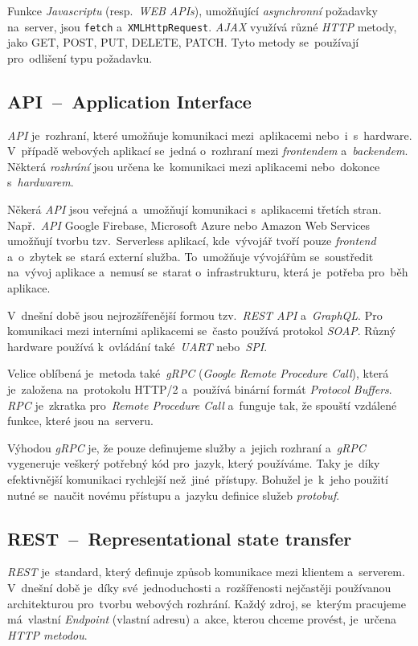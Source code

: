 \documentclass[10pt,a4paper]{article}
\begin{document}
            Funkce \emph{Javascriptu} (resp.~\emph{WEB APIs}), umožňující \emph{asynchronní} požadavky na~server, jsou \texttt{fetch} a~\texttt{XMLHttpRequest}. \emph{AJAX} využívá různé \emph{HTTP} metody, jako GET, POST, PUT, DELETE, PATCH. Tyto metody se~používají pro~odlišení typu požadavku.\cite{ajax:mdn}

        \subsection{API~--~Application Interface}
            \emph{API} je~rozhraní, které umožňuje komunikaci mezi~aplikacemi nebo~i~s~hardware. V~případě webových aplikací se~jedná o~rozhraní mezi \emph{frontendem} a~\emph{backendem}. Některá \emph{rozhrání} jsou určena ke~komunikaci mezi aplikacemi nebo~dokonce s~\emph{hardwarem}.
            
            Někerá \emph{API} jsou veřejná a~umožňují komunikaci s~aplikacemi třetích stran. Např.~\emph{API} Google Firebase, Microsoft Azure nebo Amazon Web Services umožňují tvorbu tzv.~Serverless aplikací, kde~vývojář tvoří pouze \emph{frontend} a~o~zbytek se~stará externí služba. To~umožňuje vývojářům se~soustředit na~vývoj aplikace a~nemusí se~starat o~infrastrukturu, která je~potřeba pro~běh aplikace.

            V~dnešní době jsou nejrozšířenější formou tzv.~\emph{REST API} a~\emph{GraphQL}. Pro komunikaci mezi interními aplikacemi se~často používá protokol \emph{SOAP}. Různý hardware používá k~ovládání také~\emph{UART} nebo~\emph{SPI}.

            Velice oblíbená je~metoda také~\emph{gRPC} (\emph{Google Remote Procedure Call}), která je~založena na~protokolu HTTP/2 a~používá binární formát \emph{Protocol Buffers}. \emph{RPC} je~zkratka pro~\emph{Remote Procedure Call} a~funguje tak, že spouští vzdálené funkce, které jsou na~serveru.
            
            Výhodou \emph{gRPC} je, že pouze definujeme služby a~jejich rozhraní a~\emph{gRPC} vygeneruje veškerý potřebný kód pro~jazyk, který používáme. Taky je~díky efektivnější komunikaci rychlejší než~jiné~přístupy. Bohužel je~k~jeho použití nutné se~naučit novému přístupu a~jazyku definice služeb \emph{protobuf}. \cite{thenewstackBuildRealWorld}

        \subsection{REST~--~Representational state transfer}
            \emph{REST} je~standard, který definuje způsob komunikace mezi klientem a~serverem. V~dnešní době je~díky své~jednoduchosti a~rozšířenosti nejčastěji používanou architekturou pro~tvorbu webových rozhrání. Každý zdroj, se~kterým pracujeme má~vlastní \emph{Endpoint} (vlastní adresu) a~akce, kterou chceme provést, je~určena \emph{HTTP metodou}.
            
\end{document}
